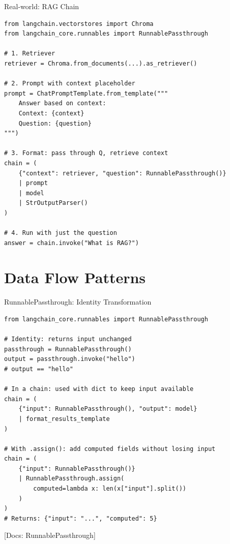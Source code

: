 \documentclass[aspectratio=169,11pt]{beamer}
\newcommand{\docref}[1]{{\scriptsize\color{docgray}[Docs: #1]}}
\begin{document}
\begin{frame}[fragile]{Real-world: RAG Chain}
  \begin{codebox}
\begin{lstlisting}
from langchain.vectorstores import Chroma
from langchain_core.runnables import RunnablePassthrough

# 1. Retriever
retriever = Chroma.from_documents(...).as_retriever()

# 2. Prompt with context placeholder
prompt = ChatPromptTemplate.from_template("""
    Answer based on context:
    Context: {context}
    Question: {question}
""")

# 3. Format: pass through Q, retrieve context
chain = (
    {"context": retriever, "question": RunnablePassthrough()}
    | prompt
    | model
    | StrOutputParser()
)

# 4. Run with just the question
answer = chain.invoke("What is RAG?")
\end{lstlisting}
  \end{codebox}
\end{frame}

\section{Data Flow Patterns}

\begin{frame}[fragile]{RunnablePassthrough: Identity Transformation}
  \begin{codebox}
\begin{lstlisting}
from langchain_core.runnables import RunnablePassthrough

# Identity: returns input unchanged
passthrough = RunnablePassthrough()
output = passthrough.invoke("hello")
# output == "hello"

# In a chain: used with dict to keep input available
chain = (
    {"input": RunnablePassthrough(), "output": model}
    | format_results_template
)

# With .assign(): add computed fields without losing input
chain = (
    {"input": RunnablePassthrough()}
    | RunnablePassthrough.assign(
        computed=lambda x: len(x["input"].split())
    )
)
# Returns: {"input": "...", "computed": 5}
\end{lstlisting}
  \end{codebox}

  \docref{RunnablePassthrough}
\end{frame}
\end{document}
